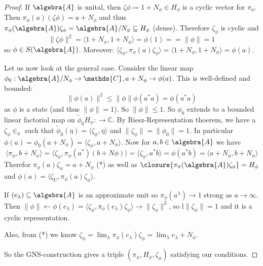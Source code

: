\documentclass[a4paper]{article}
\begin{document}
\begin{proof}
	If $\algebra{A}$ is unital, then $\zeta \phi \coloneq 1 + N_\phi \in H_\phi$ is a cyclic vector for $\pi_\phi$. 
	Then $\pi_\phi(a)(\zeta \phi) = a + N_\phi$ and thus $\pi_\phi(\algebra{A}) \zeta_\phi = \algebra{A}/N_\phi \subseteq H_\phi$ (dense).
	Therefore $\zeta_\phi$ is cyclic and
	\begin{equation*}
		\|\zeta \phi\|^2 = \langle 1 + N_\phi, 1 + N_\phi\rangle = \phi(1) = =\|\phi\| = 1
	\end{equation*}
	so $\phi \in S(\algebra{A})$. 
	Moreover: $\langle \zeta_\phi, \pi_\phi(a) \zeta_\phi\rangle = \langle 1 + N_\phi, 1 + N_\phi\rangle = \phi(a)$.

	Let us now look at the general case.
	Consider the linear map $\phi_0: \algebra{A}/N_\phi \to \mathds{C}, a + N_\phi \to \phi(a)$.
	This is well-defined and bounded:
	\begin{equation*}
		\|\phi(a)\|^2 \leq \|\phi\| \phi(a^* a) = \phi(a^*a)
	\end{equation*}
	as $\phi$ is a state (and thus $\|\phi\| = 1$).
	So $\|\phi\| \leq 1$.
	So $\phi_0$ extends to a bounded linear factorial map on $\tilde{\phi}_0 H_\phi: \to \mathds{C}$.
	By Riesz-Representation thoerem, we have a $\zeta_\phi \in_\phi$ such that $\tilde{\phi}_0 (\eta) = \langle \zeta_\phi, \eta \rangle$ and $\|\zeta_\phi\| = \|\phi_0\| = 1$.
	In particular $\phi(a) = \phi_0(a + N_\phi) = \langle \zeta_\phi, a + N_\phi \rangle$.
	Now for $a,b \in \algebra{A}$ we have
	\begin{equation*}
		\langle \pi_\phi , b + N_\phi \rangle =  \langle \zeta_\phi, \pi_\phi(a^*) (b + N \phi) \rangle = \langle \zeta_\phi, a^* b \rangle = \phi(a^*b) = \langle a + N_\phi, b + N_\phi\rangle
	\end{equation*}
	Therefor $\pi_\phi(a) \zeta_\phi = a + N_\phi$ (*) as well as $\closure{\pi_\pi(\algebra{A}) \zeta_\phi} = H_\phi$ and
	$\phi(a) = \langle \zeta_U, \pi_\phi(a) \zeta_\phi \rangle$.

	If $(e_\lambda) \subseteq \algebra{A}$ is an approximate unit so $\pi_\phi(a^\lambda) \to 1$ strong as $a \to \infty$.
	Then $\|\phi\| \leftarrow \phi(e_\lambda) = \langle \zeta_\phi, \pi_\phi(e_\lambda) \zeta_\phi \rangle \to \|\zeta_\phi\|^2$, so l$\|\zeta_\phi\| = 1$ and it is a cyclic representation. 

	Also, from (*) we know $\zeta_\phi = \lim_\lambda \pi_\phi(e_\lambda) \zeta_\phi = \lim_\lambda e_\lambda + N_\phi$.

	So the GNS-construction gives a triple $(\pi_\phi, H_\phi, \zeta_\phi)$ satisfying our conditions.
\end{proof}
\end{document}

